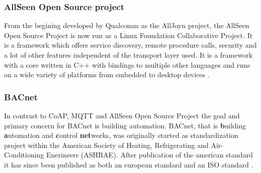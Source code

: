 \subsubsection{AllSeen Open Source project}
From the begining developed by Qualcomm as the AllJoyn project, the AllSeen
Open Source Project is now run as a Linux Foundation Collaborative Project.
It is a framework which offers service discovery, remote procedure calls,
security and a lot of other features independent of the transport layer used.
It is a framework with a core written in C++ with bindings to multiple other
languages and runs on a wide variety of platforms from embedded to desktop
devices \cite{web:alljoyn,web:allseen}.

\subsubsection{BACnet}
In contrast to CoAP, MQTT and AllSeen Open Source Project the goal and primary
concern for BACnet is building automation. BACnet, that is \textbf{b}uilding
\textbf{a}utomation and \textbf{c}ontrol \textbf{net}works, was originally
started as standardization project within the American Society of Heating,
Refrigerating and Air-Conditioning Enerineers (ASHRAE). After publication of
the american standard it has since been published as both an european standard
and an ISO standard \cite{web:bacnet}.

